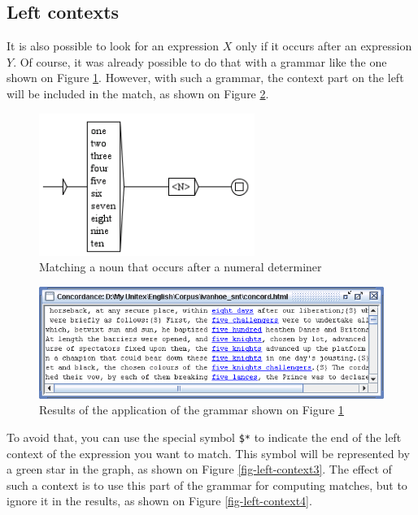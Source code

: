 \subsection{Left contexts}
\index{\verb+$*+}
It is also possible to look for an expression $X$ only if it
occurs after an expression $Y$. Of course, it was already possible to do that with a grammar
like the one shown on Figure \ref{fig-left-context1}. However, with such a
grammar, the context part on the left will be included in the match, as shown on Figure
\ref{fig-left-context2}.

\begin{figure}[!ht]
\begin{center}
\includegraphics[width=7cm]{resources/img/fig6-17a.png}
\caption{Matching a noun that occurs after a numeral
determiner\label{fig-left-context1}}
\end{center}
\end{figure}

\begin{figure}[!ht]
\begin{center}
\includegraphics[width=14cm]{resources/img/fig6-17b.png}
\caption{Results of the application of the grammar shown on Figure
\ref{fig-left-context1}\label{fig-left-context2}}
\end{center}
\end{figure}

\bigskip
\noindent To avoid that, you can use the special symbol \verb+$*+ to indicate
the end of the left context of the expression you want to match. This symbol
will be represented by a green star in the graph, as shown on Figure
\ref{fig-left-context3}. The effect of such a context is to use this part of the
grammar for computing matches, but to ignore it in the results, as shown on
Figure \ref{fig-left-context4}.

